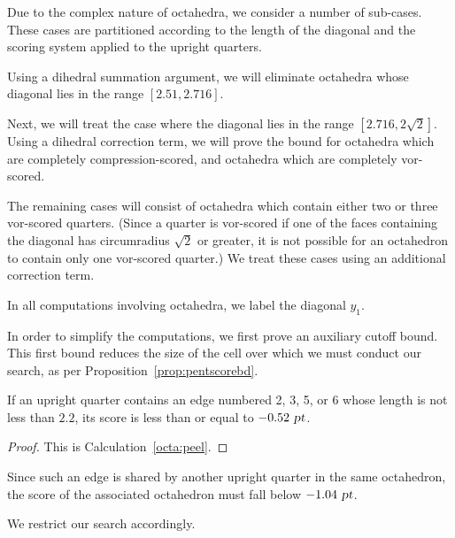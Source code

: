Due to the complex nature of octahedra, we
consider a number of sub-cases.
These cases are partitioned according to the length
of the diagonal and the scoring system applied to the upright quarters.

Using a dihedral summation argument, we will eliminate octahedra
whose diagonal lies in the range $[2.51, 2.716]$.

Next, we will treat
the case where the diagonal lies in the range $[2.716, 2\sqrt{2}]$.
Using a dihedral correction term,
we will prove the bound for octahedra which are completely
compression-scored, and octahedra which are completely vor-scored.

The remaining cases will consist of
octahedra which contain either two or three
vor-scored quarters.  (Since a quarter is vor-scored if one
of the faces containing the diagonal has circumradius $\sqrt{2}$ or
greater, it is not possible for an octahedron to contain only one
vor-scored quarter.)  We treat these cases using an additional
correction term.

In all computations involving octahedra,
we label the diagonal $y_1$.

In order to simplify the computations,
we first prove an auxiliary cutoff bound.
This first bound reduces
the size of the cell over which we must conduct our search,
as per Proposition~\ref{prop:pentscorebd}.

\begin{lem}
\label{lem:octa:peel} If an upright quarter contains an edge
numbered 2, 3, 5, or 6 whose length is not less than $2.2$, its
score is less than or equal to $-0.52 \text{ \sl pt}$.
\end{lem}

\begin{proof}
This is Calculation~\ref{octa:peel}.
\end{proof}

Since such an edge is shared by another upright quarter
in the same octahedron, the score of the
associated octahedron must fall below $-1.04 \text{ \sl pt}$.

We restrict our search accordingly.


